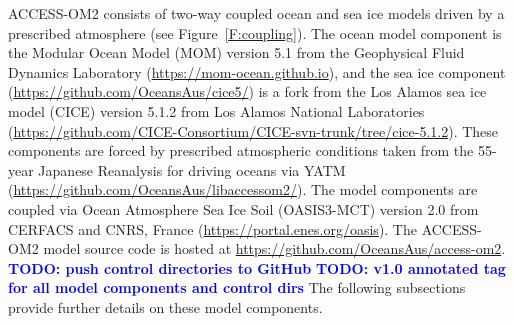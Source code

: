 \documentclass[gmd, manuscript]{copernicus}
\newcommand{\TODO}[1]{\textcolor{blue}{\textsf{\textbf{TODO: #1}}}}
\begin{document}
ACCESS-OM2 consists of two-way coupled ocean and sea ice models driven by a prescribed atmosphere (see Figure~\ref{F:coupling}).
The ocean model component is the Modular Ocean Model (MOM) version 5.1 from the Geophysical Fluid Dynamics Laboratory (\url{https://mom-ocean.github.io}), and the sea ice component (\url{https://github.com/OceansAus/cice5/}) is a fork from the Los Alamos sea ice model (CICE) version 5.1.2 from Los Alamos National Laboratories (\url{https://github.com/CICE-Consortium/CICE-svn-trunk/tree/cice-5.1.2}).
These components are forced by prescribed atmospheric conditions taken from the 55-year Japanese Reanalysis for driving oceans \citep[JRA55-do,][]{TsujinoETAL2018a} via YATM (\url{https://github.com/OceansAus/libaccessom2/}).
The model components are coupled via Ocean Atmosphere Sea Ice Soil (OASIS3-MCT) version 2.0 from CERFACS and CNRS, France (\url{https://portal.enes.org/oasis}).
The ACCESS-OM2 model source code is hosted at \url{https://github.com/OceansAus/access-om2}.
\TODO{push control directories to GitHub}
\TODO{v1.0 annotated tag for all model components and control dirs}
The following subsections provide further details on these model components.
\end{document}
